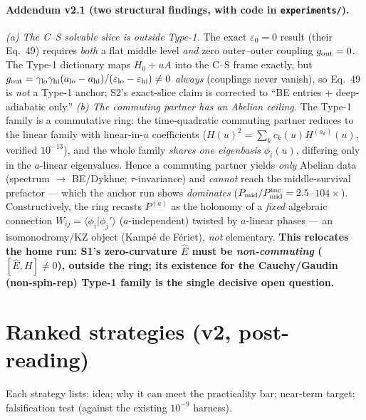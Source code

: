 \documentclass[11pt]{article}
\newcommand{\eps}{\varepsilon}
\begin{document}
\paragraph{Addendum v2.1 (two structural findings, with code in \texttt{experiments/}).}
\emph{(a) The C--S solvable slice is outside Type-1.} The exact $\eps_0{=}0$ result (their Eq.~49)
requires \emph{both} a flat middle level \emph{and} zero outer--outer coupling $g_{\rm out}=0$. The
Type-1 dictionary maps $H_0+uA$ into the C--S frame exactly, but $g_{\rm out}=\gamma_{\rm lo}
\gamma_{\rm hi}(a_{\rm lo}-a_{\rm hi})/(\eps_{\rm lo}-\eps_{\rm hi})\ne0$ \emph{always} (couplings
never vanish), so Eq.~49 is \emph{not} a Type-1 anchor; S2's exact-slice claim is corrected to
``BE entries + deep-adiabatic only.'' \emph{(b) The commuting partner has an Abelian ceiling.} The
Type-1 family is a commutative ring: the time-quadratic commuting partner reduces to the linear
family with linear-in-$u$ coefficients ($H(u)^2=\sum_k c_k(u)H^{(a_k)}(u)$, verified $10^{-13}$),
and the whole family \emph{shares one eigenbasis} $\phi_i(u)$, differing only in the $a$-linear
eigenvalues. Hence a commuting partner yields \emph{only} Abelian data (spectrum $\to$ BE/Dykhne;
$\tau$-invariance) and \emph{cannot} reach the middle-survival prefactor --- which the anchor run
shows \emph{dominates} ($P_{\rm mid}/P_{\rm mid}^{\rm inc}=2.5$--$104\times$). Constructively, the
ring recasts $P^{(a)}$ as the holonomy of a \emph{fixed} algebraic connection
$W_{ij}=\langle\phi_i|\phi_j'\rangle$ ($a$-independent) twisted by $a$-linear phases --- an
isomonodromy/KZ object (Kamp\'e de F\'eriet), \emph{not} elementary. \textbf{This relocates the home
run: S1's zero-curvature $\hat E$ must be \emph{non-commuting} ($[\hat E,H]\ne0$), outside the ring;
its existence for the Cauchy/Gaudin (non-spin-rep) Type-1 family is the single decisive open
question.}

\section{Ranked strategies (v2, post-reading)}
Each strategy lists: idea; why it can meet the practicality bar; near-term target; falsification
test (against the existing $10^{-9}$ harness).
\end{document}
